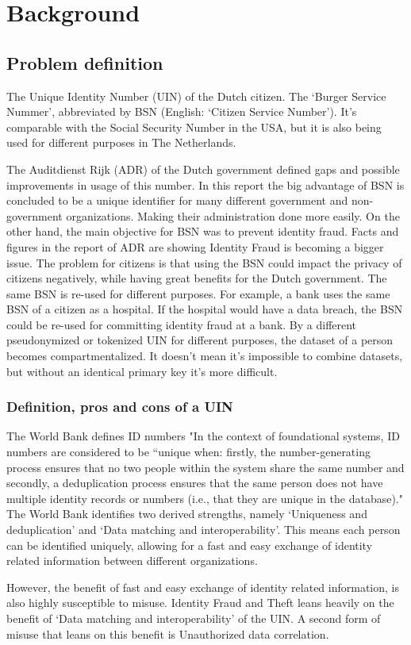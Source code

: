 \chapter{Background}\label{s:background}
\section{Problem definition}
The Unique Identity Number (UIN) of the Dutch citizen. The ‘Burger Service Nummer’, abbreviated by BSN (English: ‘Citizen Service Number’). It’s comparable with the Social Security Number in the USA, but it is also being used for different purposes in The Netherlands. \par
The Auditdienst Rijk (ADR)\cite{ADR} of the Dutch government defined gaps and possible improvements in usage of this number. In this report the big advantage of BSN is concluded to be a unique identifier for many different government and non-government organizations. Making their administration done more easily. On the other hand, the main objective for BSN was to prevent identity fraud. Facts and figures in the report of ADR are showing Identity Fraud is becoming a bigger issue. The problem for citizens is that using the BSN could impact the privacy of citizens negatively, while having great benefits for the Dutch government. The same BSN is re-used for different purposes. For example, a bank uses the same BSN of a citizen as a hospital. If the hospital would have a data breach, the BSN could be re-used for committing identity fraud at a bank. By a different pseudonymized or tokenized UIN for different purposes, the dataset of a person becomes compartmentalized. It doesn’t mean it’s impossible to combine datasets, but without an identical primary key it’s more difficult. 

\subsection{Definition, pros and cons of a UIN}
The World Bank \cite{WorldBank_UIN} defines ID numbers "In the context of foundational systems, ID numbers are considered to be “unique when: firstly, the number-generating process ensures that no two people within the system share the same number and secondly, a deduplication process ensures that the same person does not have multiple identity records or numbers (i.e., that they are unique in the database)." The World Bank identifies two derived strengths, namely ‘Uniqueness and deduplication’ and ‘Data matching and interoperability’. This means each person can be identified uniquely, allowing for a fast and easy exchange of identity related information between different organizations.\par 
However, the benefit of fast and easy exchange of identity related information, is also highly susceptible to misuse. Identity Fraud and Theft leans heavily on the benefit of ‘Data matching and interoperability’ of the UIN. A second form of misuse that leans on this benefit is Unauthorized data correlation. \par

